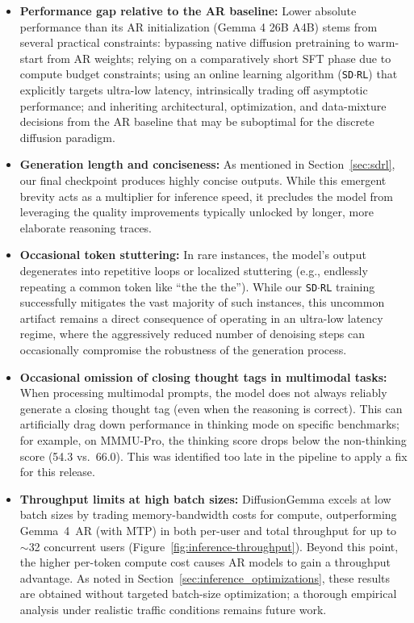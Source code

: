 \documentclass[11pt, a4paper, logo, copyright, gdm]{google}
\newcommand{\sdrl}{\texttt{{\small SD$\cdot$RL}}\xspace}
\begin{document}
\begin{itemize}[topsep=0pt]

    \item \textbf{Performance gap relative to the AR baseline:} Lower absolute performance than its AR initialization (Gemma 4 26B A4B) stems from several practical constraints: bypassing native diffusion pretraining to warm-start from AR weights; relying on a comparatively short SFT phase due to compute budget constraints; using an online learning algorithm (\sdrl) that explicitly targets ultra-low latency, intrinsically trading off asymptotic performance; and inheriting architectural, optimization, and data-mixture decisions from the AR baseline that may be suboptimal for the discrete diffusion paradigm.

    \item \textbf{Generation length and conciseness:} As mentioned in Section~\ref{sec:sdrl}, our final checkpoint produces highly concise outputs. While this emergent brevity acts as a multiplier for inference speed, it precludes the model from leveraging the quality improvements typically unlocked by longer, more elaborate reasoning traces.

    \item \textbf{Occasional token stuttering:} In rare instances, the model's output degenerates into repetitive loops or localized stuttering (e.g., endlessly repeating a common token like ``the the the''). While our \sdrl training successfully mitigates the vast majority of such instances, this uncommon artifact remains a direct consequence of operating in an ultra-low latency regime, where the aggressively reduced number of denoising steps can occasionally compromise the robustness of the generation process.
    
    \item \textbf{Occasional omission of closing thought tags in multimodal tasks:} When processing multimodal prompts, the model does not always reliably generate a closing thought tag (even when the reasoning is correct). This can artificially drag down performance in thinking mode on specific benchmarks; for example, on MMMU-Pro, the thinking score drops below the non-thinking score (54.3 vs.\ 66.0). This was identified too late in the pipeline to apply a fix for this release.

    \item \textbf{Throughput limits at high batch sizes:} DiffusionGemma excels at low batch sizes by trading memory-bandwidth costs for compute, outperforming Gemma~4~AR (with MTP) in both per-user and total throughput for up to $\sim$32 concurrent users (Figure~\ref{fig:inference-throughput}). Beyond this point, the higher per-token compute cost causes AR models to gain a throughput advantage. As noted in Section~\ref{sec:inference_optimizations}, these results are obtained without targeted batch-size optimization; a thorough empirical analysis under realistic traffic conditions remains future work.


\end{itemize}
\end{document}
